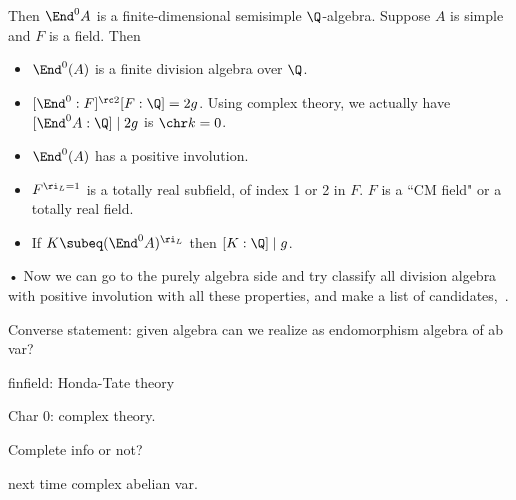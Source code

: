 Then $\End^0 A$ is a finite-dimensional semisimple $\Q$-algebra. Suppose $A$ is simple and $F$ is a field. Then 
\begin{itemize}
\item
$\End^0(A)$ is a finite division algebra over $\Q$.
\item
$[\End^0:F]^{\rc 2}[F:\Q]=2g$. Using complex theory, we actually have $[\End^0 A:\Q]\mid 2g$ is $\chr k=0$.
\item
$\End^0(A)$ has a positive involution. %
\item
$F^{\ri_L=1}$ is a totally real subfield, of index 1 or 2 in $F$. $F$ is a ``CM field" or a totally real field.
\item
If $K\subeq (\End^0A)^{\ri_L}$ then $[K:\Q]\mid g$.
\end{itemize}•
Now we can go to the purely algebra side and try classify all division algebra with positive involution with all these properties, and  make a list of candidates,~\cite[\S21]{Mu70}.


Converse statement: given algebra can we realize as endomorphism algebra of ab var?

finfield: 
Honda-Tate theory

Char 0: complex theory.

Complete info or not? %

next time complex abelian var.